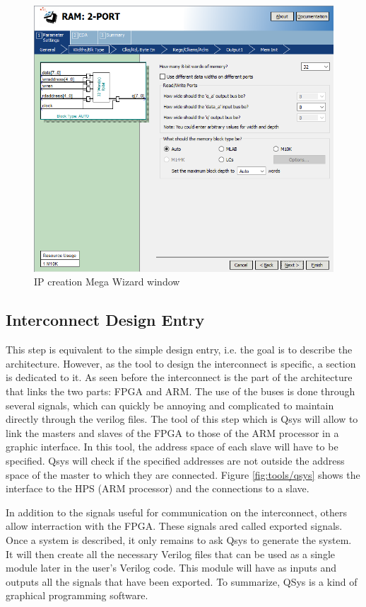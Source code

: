 \begin{figure}[H]
    \centering
    \includegraphics[scale=0.6]{Chapter2-FPGA_Flow/res/megawizard.PNG}
    \caption{IP creation Mega Wizard window}
    \label{fig:tools/megawizard}
\end{figure}

\subsection{Interconnect Design Entry}

This step is equivalent to the simple design entry, i.e. the goal is to describe the architecture. 
However, as the tool to design the interconnect is specific, a section is dedicated to it. As seen 
before the interconnect is the part of the architecture that links the two parts: FPGA and ARM. The 
use of the buses is done through several signals, which can quickly be annoying and complicated to 
maintain directly through the verilog files. The tool of this step which is Qsys will allow to link 
the masters and slaves of the FPGA to those of the ARM processor in a graphic interface. In this 
tool, the address space of each slave will have to be specified. Qsys will check if the specified 
addresses are not outside the address space of the master to which they are connected. Figure \ref{fig:tools/qsys} 
shows the interface to the HPS (ARM processor) and the connections to a slave.

In addition to the signals useful for communication on the interconnect, others allow interraction 
with the FPGA. These signals ared called exported signals. Once a system is described, it only
remains to ask Qsys to generate the system. It will then create all the necessary Verilog files that 
can be used as a single module later in the user's Verilog code. This module will have as inputs and 
outputs all the signals that have been exported. To summarize, QSys is a kind of graphical 
programming software.

